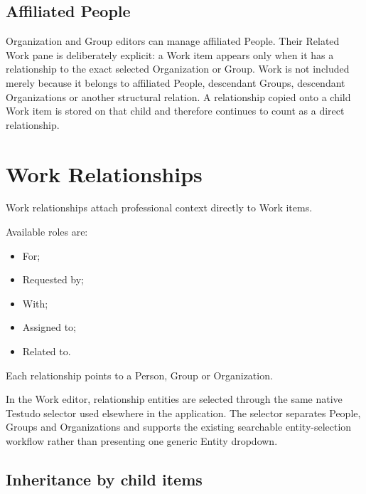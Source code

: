 \documentclass{testudomanual}
\begin{document}
\section{Affiliated People}

Organization and Group editors can manage affiliated People. Their Related Work pane is deliberately explicit: a Work item appears only when it has a relationship to the exact selected Organization or Group. Work is not included merely because it belongs to affiliated People, descendant Groups, descendant Organizations or another structural relation. A relationship copied onto a child Work item is stored on that child and therefore continues to count as a direct relationship.


\chapter{Work Relationships}

Work relationships attach professional context directly to Work items.

Available roles are:
\begin{itemize}
    \item For;
    \item Requested by;
    \item With;
    \item Assigned to;
    \item Related to.
\end{itemize}

Each relationship points to a Person, Group or Organization.

In the Work editor, relationship entities are selected through the same native Testudo selector used elsewhere in the application. The selector separates People, Groups and Organizations and supports the existing searchable entity-selection workflow rather than presenting one generic Entity dropdown.

\section{Inheritance by child items}
\end{document}
